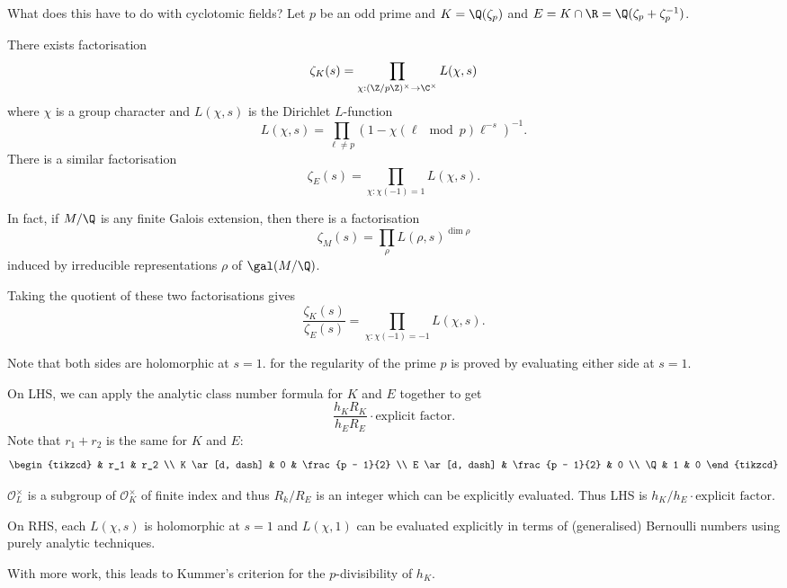 \documentclass[a4paper]{article}
\renewcommand*{\O}{\mathcal{O}}
\begin{document}
What does this have to do with cyclotomic fields? Let \(p\) be an odd prime and \(K = \Q(\zeta_p)\) and \(E = K \cap \R = \Q(\zeta_p + \zeta_p^{-1})\).

There exists factorisation
\[
  \zeta_K(s) = \prod_{\chi: (\Z/p\Z)^\times \to \C^\times} L(\chi, s)
\]
where \(\chi\) is a group character and \(L(\chi, s)\) is the Dirichlet \(L\)-function
\[
  L(\chi, s) = \prod_{\ell \neq p} (1 - \chi (\ell \mod p) \ell^{-s})^{-1}.
\]
There is a similar factorisation
\[
  \zeta_E(s) = \prod_{\chi: \chi(-1) = 1} L(\chi, s).
\]

In fact, if \(M/\Q\) is any finite Galois extension, then there is a factorisation
\[
  \zeta_M(s) = \prod_\rho L(\rho, s)^{\dim \rho}
\]
induced by irreducible representations \(\rho\) of \(\gal(M/\Q)\).

Taking the quotient of these two factorisations gives
\[
  \frac{\zeta_K(s)}{\zeta_E(s)} = \prod_{\chi: \chi(-1) = -1} L(\chi, s).
\]

Note that both sides are holomorphic at \(s = 1\).  for the regularity of the prime \(p\) is proved by evaluating either side at \(s = 1\).

On LHS, we can apply the analytic class number formula for \(K\) and \(E\) together to get
\[
  \frac{h_K R_K}{h_E R_E} \cdot \text{explicit factor}.
\]
Note that \(r_1 + r_2\) is the same for \(K\) and \(E\):
\[
  \begin{tikzcd}
    & r_1 & r_2 \\
    K \ar[d, dash] & 0 & \frac{p - 1}{2} \\
    E \ar[d, dash] & \frac{p - 1}{2} & 0 \\
    \Q & 1 & 0
  \end{tikzcd}
\]

\(\O_L^\times\) is a subgroup of \(\O_K^\times\) of finite index and thus \(R_k/R_E\) is an integer which can be explicitly evaluated. Thus LHS is \(h_K/h_E \cdot \text{explicit factor}\).

On RHS, each \(L(\chi, s)\) is holomorphic at \(s = 1\) and \(L(\chi, 1)\) can be evaluated explicitly in terms of (generalised) Bernoulli numbers using purely analytic techniques.

With more work, this leads to Kummer's criterion for the \(p\)-divisibility of \(h_K\).






\printindex


\iffalse
Reading

Marcus, Number Fields
secret notes: https://www.dpmms.cam.ac.uk/~jat58/nfl2018
\fi
\end{document}
